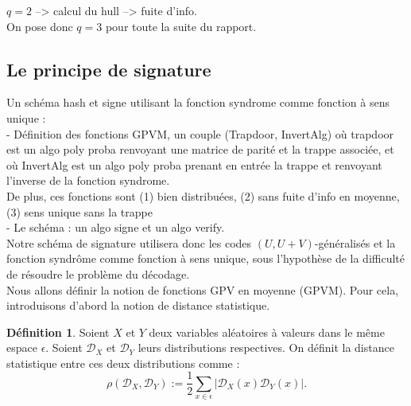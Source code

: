 \documentclass[12pt]{article}
\theoremstyle{definition}
\newtheorem{defi}[thm]{Définition}
\begin{document}
$q=2$ --> calcul du hull --> fuite d'info. \\
On pose donc $q=3$ pour toute la suite du rapport.

\subsection{Le principe de signature}
Un schéma hash et signe utilisant la fonction syndrome comme fonction à sens unique : \\
- Définition des fonctions GPVM, un couple (Trapdoor, InvertAlg) où trapdoor est un algo poly proba renvoyant une matrice de parité et la trappe associée, et où InvertAlg est un algo poly proba prenant en entrée la trappe et renvoyant l'inverse de la fonction syndrome. \\
De plus, ces fonctions sont (1) bien distribuées, (2) sans fuite d'info en moyenne, (3) sens unique sans la trappe \\
- Le schéma : un algo signe et un algo verify. \\

Notre schéma de signature utilisera donc les codes $(U,U+V)$-généralisés et la fonction syndrôme comme fonction à sens unique, sous l'hypothèse de la difficulté de résoudre le problème du décodage. \\

Nous allons définir la notion de fonctions GPV en moyenne (GPVM). Pour cela, introduisons d'abord la notion de distance statistique.

\begin{defi}
Soient $X$ et $Y$ deux variables aléatoires à valeurs dans le même espace $\epsilon$. 
Soient $\mathcal{D}_X$ et $\mathcal{D}_Y$ leurs distributions respectives. On définit la distance statistique entre ces deux distributions comme :
$$ \rho(\mathcal{D}_X,\mathcal{D}_Y) := \frac{1}{2} \sum_{x \in \epsilon} |\mathcal{D}_X(x) \mathcal{D}_Y(x)|.$$
\end{defi}
\end{document}

